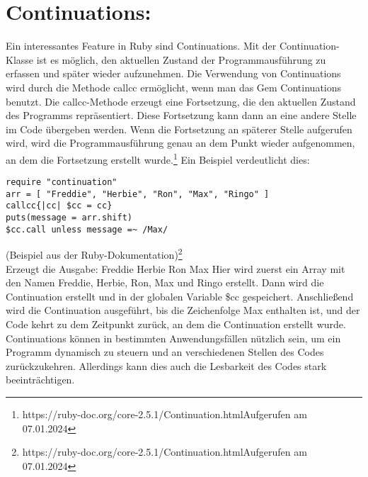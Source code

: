 \documentclass{article}
\begin{document}
\section*{ Continuations:}
Ein interessantes Feature in Ruby sind Continuations. Mit der Continuation-Klasse ist es möglich, den aktuellen Zustand der Programmausführung zu erfassen und später wieder aufzunehmen. Die Verwendung von Continuations wird durch die Methode \glqq callcc\grqq{} ermöglicht, wenn man das Gem Continuations benutzt. Die callcc-Methode erzeugt eine Fortsetzung, die den aktuellen Zustand des Programms repräsentiert. Diese Fortsetzung kann dann an eine andere Stelle im Code übergeben werden. Wenn die Fortsetzung an späterer Stelle aufgerufen wird, wird die Programmausführung genau an dem Punkt wieder aufgenommen, an dem die Fortsetzung erstellt wurde.\footnote{https://ruby-doc.org/core-2.5.1/Continuation.htmlAufgerufen am 07.01.2024} Ein Beispiel verdeutlicht dies: \\ 
\begin{lstlisting}
require "continuation" 
arr = [ "Freddie", "Herbie", "Ron", "Max", "Ringo" ] 
callcc{|cc| $cc = cc} 
puts(message = arr.shift) 
$cc.call unless message =~ /Max/  
\end{lstlisting}
(Beispiel aus der Ruby-Dokumentation)\footnote{https://ruby-doc.org/core-2.5.1/Continuation.htmlAufgerufen am 07.01.2024} \\ 
Erzeugt die Ausgabe: \glqq Freddie Herbie Ron Max\grqq{}
Hier wird zuerst ein Array mit den Namen \glqq Freddie\grqq{}, \glqq Herbie\grqq{}, \glqq Ron\grqq{}, \glqq Max\grqq{} und \glqq Ringo\grqq{} erstellt. Dann wird die Continuation erstellt und in der globalen Variable \$cc gespeichert. Anschließend wird die Continuation ausgeführt, bis die Zeichenfolge \glqq Max\grqq{} enthalten ist, und der Code kehrt zu dem Zeitpunkt zurück, an dem die Continuation erstellt wurde.
Continuations können in bestimmten Anwendungsfällen nützlich sein, um ein Programm dynamisch zu steuern und an verschiedenen Stellen des Codes zurückzukehren. Allerdings kann dies auch die Lesbarkeit des Codes stark beeinträchtigen.
\end{document}
